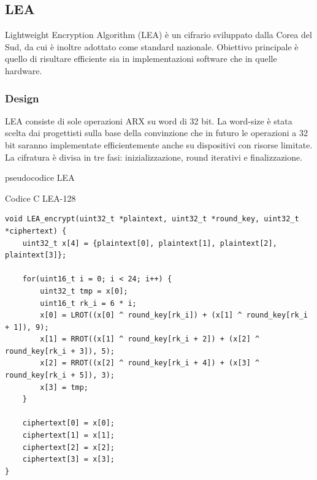 \documentclass[target=bach,aauheader=,style=]{thud}
\begin{document}
		\subsection{LEA\cite{lea}}
		Lightweight Encryption Algorithm (LEA) è un cifrario sviluppato dalla Corea del Sud, da cui è inoltre adottato come standard nazionale. Obiettivo principale è quello di risultare efficiente sia in implementazioni software che in quelle hardware.
			\subsubsection{Design}
			LEA consiste di sole operazioni ARX su word di 32 bit. La word-size è stata scelta dai progettisti sulla base della convinzione che in futuro le operazioni a 32 bit saranno implementate efficientemente anche su dispositivi con risorse limitate.
			La cifratura è divisa in tre fasi: inizializzazione, round iterativi e finalizzazione.
			\begin{algorithm}
				\caption{pseudocodice LEA}
				\begin{algorithmic}
						\EndFor
					\EndProcedure
				\end{algorithmic}
			\end{algorithm}
			
						\begin{algorithm}
				\caption{Codice C LEA-128}
\begin{lstlisting}[style=CStyle]
void LEA_encrypt(uint32_t *plaintext, uint32_t *round_key, uint32_t *ciphertext) {
	uint32_t x[4] = {plaintext[0], plaintext[1], plaintext[2], plaintext[3]};
	
	for(uint16_t i = 0; i < 24; i++) {
		uint32_t tmp = x[0];
		uint16_t rk_i = 6 * i;
		x[0] = LROT((x[0] ^ round_key[rk_i]) + (x[1] ^ round_key[rk_i + 1]), 9);
		x[1] = RROT((x[1] ^ round_key[rk_i + 2]) + (x[2] ^ round_key[rk_i + 3]), 5);
		x[2] = RROT((x[2] ^ round_key[rk_i + 4]) + (x[3] ^ round_key[rk_i + 5]), 3);
		x[3] = tmp;
	}
	
	ciphertext[0] = x[0];
	ciphertext[1] = x[1];
	ciphertext[2] = x[2];
	ciphertext[3] = x[3];
}\end{lstlisting}
			\end{algorithm}
\end{document}
